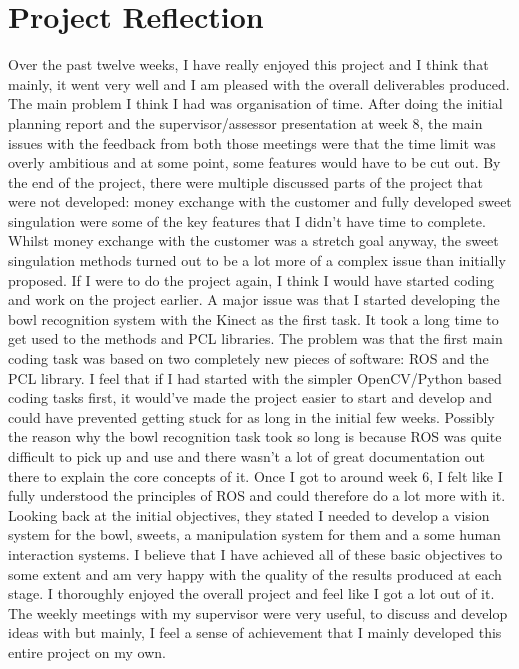 \section{Project Reflection}
Over the past twelve weeks, I have really enjoyed this project and I think that mainly, it went very well and I am pleased with the overall deliverables produced. The main problem I think I had was organisation of time. After doing the initial planning report and the supervisor/assessor presentation at week 8, the main issues with the feedback from both those meetings were that the time limit was overly ambitious and at some point, some features would have to be cut out. By the end of the project, there were multiple discussed parts of the project that were not developed: money exchange with the customer and fully developed sweet singulation were some of the key features that I didn't have time to complete. Whilst money exchange with the customer was a stretch goal anyway, the sweet singulation methods turned out to be a lot more of a complex issue than initially proposed.
\newline\newline
If I were to do the project again, I think I would have started coding and work on the project earlier. A major issue was that I started developing the bowl recognition system with the Kinect as the first task. It took a long time to get used to the methods and PCL libraries. The problem was that the first main coding task was based on two completely new pieces of software: ROS and the PCL library. I feel that if I had started with the simpler OpenCV/Python based coding tasks first, it would've made the project easier to start and develop and could have prevented getting stuck for as long in the initial few weeks. Possibly the reason why the bowl recognition task took so long is because ROS was quite difficult to pick up and use and there wasn't a lot of great documentation out there to explain the core concepts of it. Once I got to around week 6, I felt like I fully understood the principles of ROS and could therefore do a lot more with it.
\newline\newline
Looking back at the initial objectives, they stated I needed to develop a vision system for the bowl, sweets, a manipulation system for them and a some human interaction systems. I believe that I have achieved all of these basic objectives to some extent and am very happy with the quality of the results produced at each stage. I thoroughly enjoyed the overall project and feel like I got a lot out of it. The weekly meetings with my supervisor were very useful, to discuss and develop ideas with but mainly, I feel a sense of achievement that I mainly developed this entire project on my own.